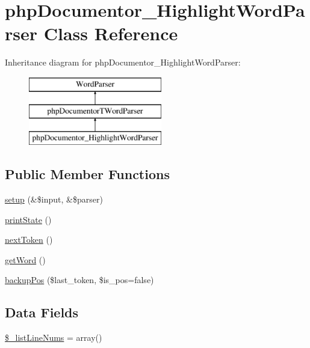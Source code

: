 \hypertarget{classphp_documentor___highlight_word_parser}{\section{php\-Documentor\-\_\-\-Highlight\-Word\-Parser \-Class \-Reference}
\label{classphp_documentor___highlight_word_parser}
}
\-Inheritance diagram for php\-Documentor\-\_\-\-Highlight\-Word\-Parser\-:\begin{figure}[H]
\begin{center}
\leavevmode
\includegraphics[height=3.000000cm]{classphp_documentor___highlight_word_parser}
\end{center}
\end{figure}
\subsection*{\-Public \-Member \-Functions}
\begin{DoxyCompactItemize}
\item 
\hyperlink{classphp_documentor___highlight_word_parser_abbac814e49e76eae59fdd1b02a7150ca}{setup} (\&\$input, \&\$parser)
\item 
\hyperlink{classphp_documentor___highlight_word_parser_a79987ebb7bd54beb3affd49b9d65bde1}{print\-State} ()
\item 
\hyperlink{classphp_documentor___highlight_word_parser_a28f33aeda1185cf6afaddf8d0a5c10c7}{next\-Token} ()
\item 
\hyperlink{classphp_documentor___highlight_word_parser_aed2fad5b3be15693fc9b44b7b73af497}{get\-Word} ()
\item 
\hyperlink{classphp_documentor___highlight_word_parser_ac123290e173042dfaba5b34a38524b58}{backup\-Pos} (\$last\-\_\-token, \$is\-\_\-pos=false)
\end{DoxyCompactItemize}
\subsection*{\-Data \-Fields}
\begin{DoxyCompactItemize}
\item 
\hyperlink{classphp_documentor___highlight_word_parser_adbfd10e0d8d8ce86f1ee4e94ad658666}{\$\-\_\-list\-Line\-Nums} = array()
\end{DoxyCompactItemize}


